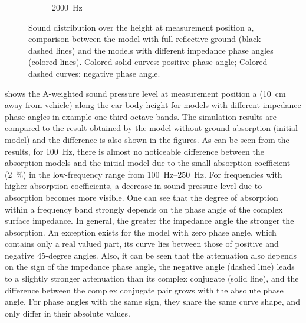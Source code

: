 \begin{figure}
\begin{subfigure}[b]{\textwidth}
		\caption{\SI{2000}{\hertz}}
	\end{subfigure}

	\caption{Sound distribution over the height at measurement position a, comparison between the model with full reflective ground (black dashed lines) and the models with different impedance phase angles (colored lines). Colored solid curves: positive phase angle; Colored dashed curves: negative phase angle.}
	\label{fig:third_octave_over_height_impedance}
\end{figure}

 shows the A-weighted sound pressure level at measurement position a (\SI{10}{\centi\meter} away from vehicle) along the car body height for models with different impedance phase angles in example one third octave bands. The simulation results are compared to the result obtained by the model without ground absorption (initial model) and the difference is also shown in the figures.
As can be seen from the results, for \SI{100}{\hertz}, there is almost no noticeable difference between the absorption models and the initial model due to the small absorption coefficient (\SI{2}{\percent}) in the low-frequency range from \SIrange{100}{250}{\hertz}. For frequencies with higher absorption coefficients, a decrease in sound pressure level due to absorption becomes more visible. One can see that the degree of absorption within a frequency band strongly depends on the phase angle of the complex surface impedance. In general, the greater the impedance angle the stronger the absorption. An exception exists for the model with zero phase angle, which contains only a real valued part, its curve lies between those of positive and negative 45-degree angles. Also, it can be seen that the attenuation also depends on the sign of the impedance phase angle, the negative angle (dashed line) leads to a slightly stronger attenuation than its complex conjugate (solid line), and the difference between the complex conjugate pair grows with the absolute phase angle. For phase angles with the same sign, they share the same curve shape, and only differ in their absolute values.

